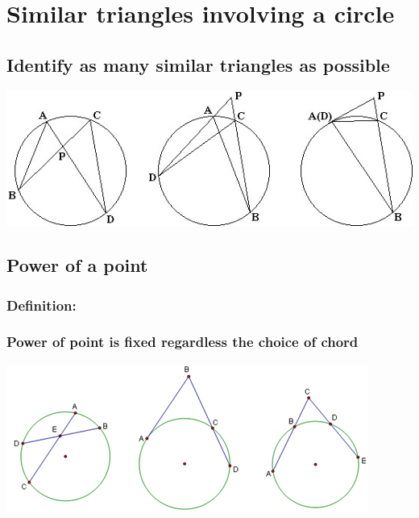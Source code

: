 \documentclass{article}
\begin{document}
\pagebreak

\section{Similar triangles involving a circle}

\subsection{Identify as many similar triangles as possible}

\includegraphics[scale=.75]{Picture12.jpg}

\vspace{100px}

\subsection{Power of a point}

\subsubsection{Definition:}

\vspace{20px}

\subsubsection{Power of point is fixed regardless the choice of chord}

\includegraphics[scale=1.2]{Picture13.png}
\end{document}

